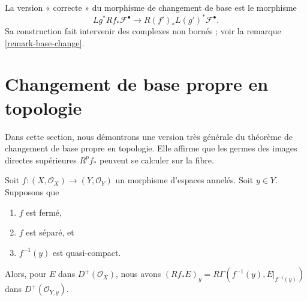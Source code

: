 \begin{remark}

\label{remark-correct-version-base-change-map}
La version « correcte » du morphisme de changement de base est le morphisme $$
Lg^* Rf_* \mathcal{F}^\bullet
\longrightarrow
R(f')_* L(g')^*\mathcal{F}^\bullet.
$$ Sa construction fait intervenir des complexes non bornés ; voir la remarque \ref{remark-base-change}.
\end{remark}





\section{Changement de base propre en topologie}

\label{section-proper-base-change}

\noindent
Dans cette section, nous démontrons une version très générale du théorème de changement de base propre en topologie. Elle affirme que les germes des images directes supérieures $R^pf_*$ peuvent se calculer sur la fibre.

\begin{lemma}

\label{lemma-proper-base-change}
Soit $f : (X, \mathcal{O}_X) \to (Y, \mathcal{O}_Y)$ un morphisme d'espaces annelés. Soit $y \in Y$. Supposons que
\begin{enumerate}
\item $f$ est fermé,
\item $f$ est séparé, et
\item $f^{-1}(y)$ est quasi-compact.
\end{enumerate}
Alors, pour $E$ dans $D^+(\mathcal{O}_X)$, nous avons $(Rf_*E)_y = R\Gamma(f^{-1}(y), E|_{f^{-1}(y)})$ dans $D^+(\mathcal{O}_{Y, y})$.
\end{lemma}

